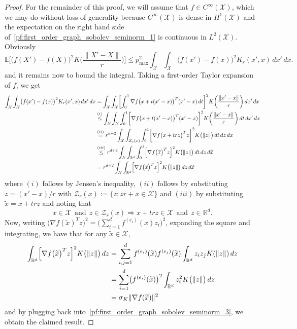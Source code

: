 \documentclass{article}
\newcommand{\Reals}{\mathbb{R}}
\newcommand{\1}{\mathbf{1}}
\newcommand{\Rd}{\Reals^d}
\newcommand{\Xset}{\mathcal{X}}
\newcommand{\Leb}{L}
\newcommand{\mc}[1]{\mathcal{#1}}
\newcommand{\Ebb}{\mathbb{E}}
\newcommand{\wt}[1]{\widetilde{#1}}
\theoremstyle{alden}
\theoremstyle{aldenthm}
\theoremstyle{definition}
\theoremstyle{remark}
\begin{document}
\begin{proof}
	For the remainder of this proof, we will assume that $f \in C^{\infty}(\Xset)$, which we may do without loss of generality because $C^{\infty}(\Xset)$ is dense in $H^1(\Xset)$ and the expectation on the right hand side of~\eqref{pf:first_order_graph_sobolev_seminorm_1} is continuous in $\Leb^2(\Xset)$. Obviously
	\begin{equation}
	\Ebb\biggl[\bigl(f(X') - f(X)\bigr)^2K\biggl(\frac{\|X' - X\|}{r}\biggr)\biggr] \leq p_{\max}^2 \int_{\Xset} \int_{\Xset} \bigl(f(x') - f(x)\bigr)^2 K_r(x',x) \,dx' \,dx. \label{pf:first_order_graph_sobolev_seminorm_2}
	\end{equation}
	and it remains now to bound the integral. Taking a first-order Taylor expansion of $f$, we get
	\begin{align}
	\int_{\Xset} \int_{\Xset} \bigl(f(x') - f(x)\bigr)^2 K_r(x',x) \,dx' \,dx & = \int_{\Xset} \int_{\Xset} \biggl[\int_{0}^{1} \nabla f\bigl(x + t(x' - x)\bigr)^T (x' - x)\,dt\biggr]^2 K\biggl(\frac{\|x' - x\|}{r}\biggr) \,dx' \,dx \nonumber \\
	& \overset{(i)}{\leq} \int_{\Xset} \int_{\Xset} \int_{0}^{1} \biggl[\nabla f\bigl(x + t(x' - x)\bigr)^T (x' - x)\biggr]^2 K\biggl(\frac{\|x' - x\|}{r}\biggr) \,dt\,dx' \,dx \nonumber \\
	& \overset{(ii)}{=} r^{d + 2} \int_{\Xset} \int_{\mc{Z}_r(x)} \int_{0}^{1} \biggl[\nabla f\bigl(x + trz\bigr)^T z\biggr]^2 K\bigl(\|z\|\bigr) \,dt\,dz \,dx \\
	&  \overset{(iii)}{\leq} r^{d + 2} \int_{\Xset} \int_{\Reals^d} \int_{0}^{1} \Bigl[\nabla f\bigl(\wt{x}\bigr)^T z\Bigr]^2 K\bigl(\|z\|\bigr) \,dt \,dz \,d\wt{x} \nonumber \\
	& = r^{d + 2} \int_{\Xset} \int_{\Reals^d} \Bigl[\nabla f\bigl(\wt{x}\bigr)^T z\Bigr]^2 K\bigl(\|z\|\bigr) \,dz \,d\wt{x} \label{pf:first_order_graph_sobolev_seminorm_3}
	\end{align}
	where $(i)$ follows by Jensen's inequality, $(ii)$ follows by substituting $z = (x' - x)/r$ with $\mc{Z}_r(x) := \{z: zr + x \in \Xset\}$ and $(iii)$ by substituting $\wt{x} = x + trz$ and noting that
	\begin{equation*}
	x \in \Xset ~~\textrm{and}~~ z \in \mc{Z}_r(x) \Longrightarrow x + trz \in \Xset ~~\textrm{and}~~ z \in \Reals^d.
	\end{equation*}
	Now, writing $\bigl(\nabla f(\wt{x}) ^T z\bigr)^2 = \bigl(\sum_{i = 1}^{d} f^{(e_i)}(x) z_{i}\bigr)^2$, expanding the square and integrating, we have that for any $\wt{x} \in \Xset$,
	\begin{align*}
	\int_{\Reals^d} \Bigl[\nabla f\bigl(\wt{x}\bigr)^T z\Bigr]^2 K\bigl(\|z\|\bigr) \,dz & = \sum_{i,j = 1}^{d} f^{(e_i)}(\wt{x}) f^{(e_j)}(\wt{x}) \int_{\Rd} z_iz_jK(\|z\|) \,dz \\
	& = \sum_{i = 1}^{d} \bigl(f^{(e_i)}(\wt{x})\bigr)^2 \int_{\Rd} z_i^2 K\bigl(\|z\|\bigr) \,dz \\
	& = \sigma_K \|\nabla f(\wt{x})\|^2
	\end{align*}
	and by plugging back into~\eqref{pf:first_order_graph_sobolev_seminorm_3}, we obtain the claimed result.
\end{proof}
\end{document}

